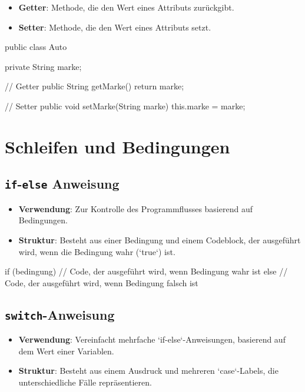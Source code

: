 \documentclass[a4paper,10pt, dvipsnames]{report}
\newcommand{\javaInLine}[1]{\texttt{#1}}
\begin{document}
\begin{itemize}
    \item \textbf{Getter}: Methode, die den Wert eines Attributs zurückgibt.
    \item \textbf{Setter}: Methode, die den Wert eines Attributs setzt.
\end{itemize}

\begin{javacodebox}
public class Auto {
    private String marke;

    // Getter
    public String getMarke() {
        return marke;
    }

    // Setter
    public void setMarke(String marke) {
        this.marke = marke;
    }
}
\end{javacodebox}



\section{Schleifen und Bedingungen}

\subsection{\javaInLine{if}-\javaInLine{else} Anweisung}

\begin{itemize}
    \item \textbf{Verwendung}: Zur Kontrolle des Programmflusses basierend auf Bedingungen.
    \item \textbf{Struktur}: Besteht aus einer Bedingung und einem Codeblock, der ausgeführt wird, wenn die Bedingung wahr (`true`) ist.
\end{itemize}

\begin{javacodebox}
if (bedingung) {
    // Code, der ausgeführt wird, wenn Bedingung wahr ist
} else {
    // Code, der ausgeführt wird, wenn Bedingung falsch ist
}
\end{javacodebox}



\subsection{\javaInLine{switch}-Anweisung}

\begin{itemize}
    \item \textbf{Verwendung}: Vereinfacht mehrfache `if-else`-Anweisungen, basierend auf dem Wert einer Variablen.
    \item \textbf{Struktur}: Besteht aus einem Ausdruck und mehreren `case`-Labels, die unterschiedliche Fälle repräsentieren.
\end{itemize}
\end{document}
